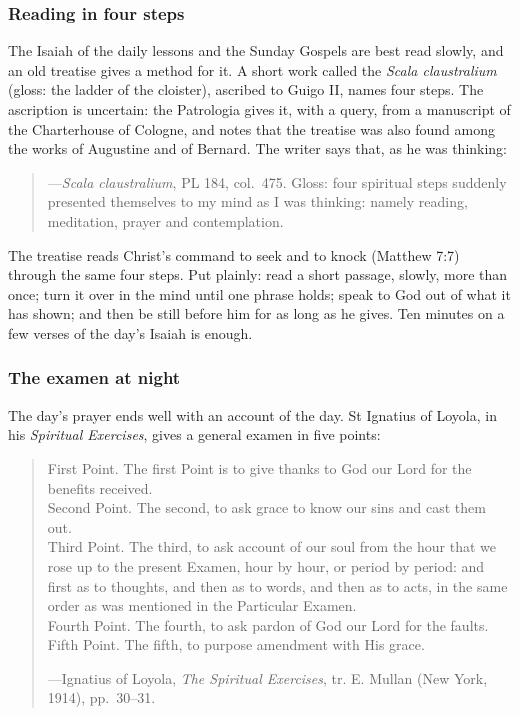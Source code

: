 \subsubsection{Reading in four steps}

The Isaiah of the daily lessons and the Sunday Gospels are best read slowly, and an old treatise
gives a method for it. A short work called the \textit{Scala claustralium} (gloss: the ladder
of the cloister), ascribed to Guigo II, names four steps. The ascription is uncertain: the
Patrologia gives it, with a query, from a manuscript of the Charterhouse of Cologne, and notes that
the treatise was also found among the works of Augustine and of Bernard. The writer says that,
as he was thinking:

\begin{quote}
\par
{\smallskip\noindent\small ---\textit{Scala claustralium}, PL 184, col.~475. Gloss: four
spiritual steps suddenly presented themselves to my mind as I was thinking: namely reading,
meditation, prayer and contemplation.\par}
\end{quote}

\noindent The treatise reads Christ's command to seek and to knock (Matthew 7:7) through the same
four steps. Put plainly: read a short passage, slowly, more than
once; turn it over in the mind until one phrase holds; speak to God out of what it has shown; and
then be still before him for as long as he gives. Ten minutes on a few verses of the day's Isaiah
is enough.

\subsubsection{The examen at night}

The day's prayer ends well with an account of the day. St Ignatius of Loyola, in his
\textit{Spiritual Exercises}, gives a general examen in five points:

\begin{quote}
First Point. The first Point is to give thanks to God our Lord for the benefits received.\\
Second Point. The second, to ask grace to know our sins and cast them out.\\
Third Point. The third, to ask account of our soul from the hour that we rose up to the present
Examen, hour by hour, or period by period: and first as to thoughts, and then as to words, and
then as to acts, in the same order as was mentioned in the Particular Examen.\\
Fourth Point. The fourth, to ask pardon of God our Lord for the faults.\\
Fifth Point. The fifth, to purpose amendment with His grace.\par
{\smallskip\noindent\small ---Ignatius of Loyola, \textit{The Spiritual Exercises}, tr. E. Mullan
(New York, 1914), pp.~30--31.\par}
\end{quote}

